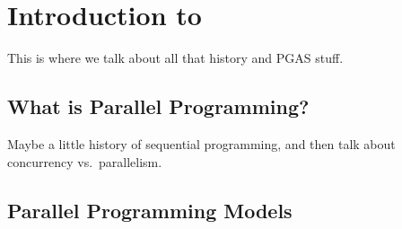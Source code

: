 %
% 
% 
% 
% 
% 
% 
%

\chapter{Introduction to \openshmem}

This is where we talk about all that history and PGAS stuff.

\section{What is Parallel Programming?}

Maybe a little history of sequential programming, and then talk about
concurrency vs.\ parallelism.

\section{Parallel Programming Models}

